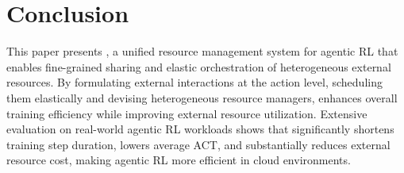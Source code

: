 \section{Conclusion}
This paper presents \sysname, a unified resource management system for agentic RL that enables fine-grained sharing and elastic orchestration of heterogeneous external resources. By formulating external interactions at the action level, scheduling them elastically and devising heterogeneous resource managers, \sysname enhances overall training efficiency while improving external resource utilization. Extensive evaluation on real-world agentic RL workloads shows that \sysname significantly shortens training step duration, lowers average ACT, and substantially reduces external resource cost, making agentic RL more efficient in cloud environments.
